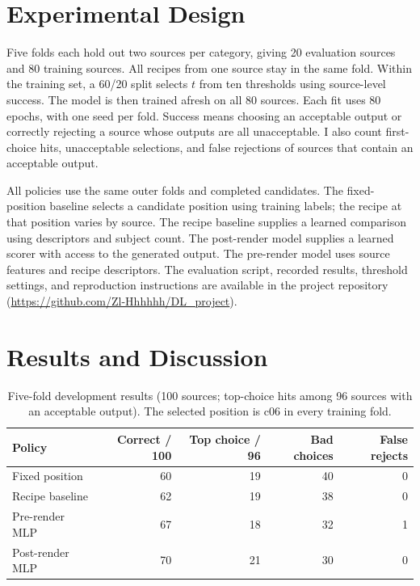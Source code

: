 \documentclass{article}
\begin{document}
\section{Experimental Design}
Five folds each hold out two sources per category, giving 20 evaluation sources and 80 training sources. All recipes from one source stay in the same fold. Within the training set, a 60/20 split selects $t$ from ten thresholds using source-level success. The model is then trained afresh on all 80 sources. Each fit uses 80 epochs, with one seed per fold. Success means choosing an acceptable output or correctly rejecting a source whose outputs are all unacceptable. I also count first-choice hits, unacceptable selections, and false rejections of sources that contain an acceptable output.

All policies use the same outer folds and completed candidates. The fixed-position baseline selects a candidate position using training labels; the recipe at that position varies by source. The recipe baseline supplies a learned comparison using descriptors and subject count. The post-render model supplies a learned scorer with access to the generated output. The pre-render model uses source features and recipe descriptors. The evaluation script, recorded results, threshold settings, and reproduction instructions are available in the project repository (\url{https://github.com/Zl-Hhhhhh/DL_project}).

\section{Results and Discussion}

\begin{table}[H]
\centering
\caption{Five-fold development results (100 sources; top-choice hits among 96 sources with an acceptable output). The selected position is c06 in every training fold.}
\label{tab:results}
\small
\begin{tabular}{lrrrr}
\toprule
Policy & Correct / 100 & Top choice / 96 & Bad choices & False rejects \\
\midrule
Fixed position & 60 & 19 & 40 & 0 \\
Recipe baseline & 62 & 19 & 38 & 0 \\
Pre-render MLP & 67 & 18 & 32 & 1 \\
Post-render MLP & 70 & 21 & 30 & 0 \\
\bottomrule
\end{tabular}
\end{table}
\end{document}

